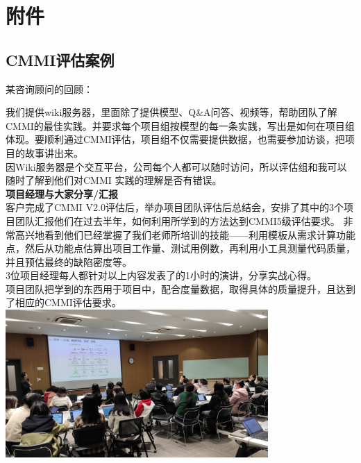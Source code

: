 
\hypertarget{ux9644ux4ef6}{%
\section{附件}\label{ux9644ux4ef6}}

\hypertarget{ux9644ux4ef6ux6848ux4f8b}{%
\subsection{CMMI评估案例}\label{ux9644ux4ef6ux6848ux4f8b}}


某咨询顾问的回顾：

我们提供wiki服务器，里面除了提供模型、Q\&A问答、视频等，帮助团队了解CMMI的最佳实践。并要求每个项目组按模型的每一条实践，写出是如何在项目组体现。要顺利通过CMMI评估，项目组不仅需要提供数据，也需要参加访谈，把项目的故事讲出来。\\
因Wiki服务器是个交互平台，公司每个人都可以随时访问，所以评估组和我可以随时了解到他们对CMMI
实践的理解是否有错误。\\


\textbf{项目经理与大家分享/汇报}\\

客户完成了CMMI
V2.0评估后，举办项目团队评估后总结会，安排了其中的3个项目团队汇报他们在过去半年，如何利用所学到的方法达到CMMI5级评估要求。
非常高兴地看到他们已经掌握了我们老师所培训的技能------利用模板从需求计算功能点，然后从功能点估算出项目工作量、测试用例数，再利用小工具测量代码质量，并且预估最终的缺陷密度等。\\
3位项目经理每人都针对以上内容发表了的1小时的演讲，分享实战心得。\\
项目团队把学到的东西用于项目中，配合度量数据，取得具体的质量提升，且达到了相应的CMMI评估要求。\\

\includegraphics[width=10cm]{000.jpg}

